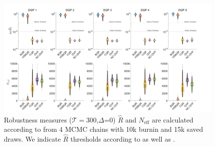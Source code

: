 

\begin{figure}
    \centering
    \includegraphics[width=\linewidth]{Figures/Robustness.jpg}
    \caption{Robustness measures ($\mathcal{T}=300$,$\varDelta$=0) $\hat{R}$ and $N_{\mathrm{eff}}$ are calculated according to \citet{vehtari2021rank} from 4 $\mathrm{MCMC}$ chains with 10k burnin and 15k saved draws. We indicate $\hat{R}$ thresholds according to \citet{vehtari_practical_2017} as well as \citet{gelman_bayesian_1996}.}
    \label{fig:RobustMeas}
\end{figure}
\vspace{-0.5cm}


